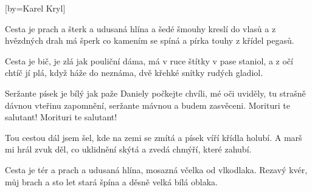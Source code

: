 [by={Karel Kryl}]

\beginverse{}
Cesta je prach a šterk a udusaná hlína
a šedé šmouhy kreslí do vlasů
\lrep{} a z hvězdných drah má šperk co kamením se spíná
a pírka touhy z křídel pegasů. \rrep{}
\endverse{}

\beginverse{}
Cesta je bič, je zlá jak pouliční dáma,
má v ruce štítky v pase staniol,
\lrep{} a z očí chtíč jí plá, když háže do neznáma,
dvě křehké snítky rudých gladiol. \rrep{}
\endverse{}

\beginchorus{}
Seržante písek je bílý jak paže Daniely
počkejte chvíli, mé oči uviděly,
tu strašně dávnou vteřinu zapomnění,
seržante mávnou a budem zasvěceni.
Morituri te salutant! Morituri te salutant!
\endchorus{}

\beginverse{}
Tou cestou dál jsem šel, kde na zemi se zmítá
a písek víří křídla holubí.
\lrep{} A marš mi hrál zvuk děl, co uklidnění skýtá
a zvedá chmýří, které zahubí. \rrep{}
\endverse{}

\beginverse{}
Cesta je tér a prach a udusaná hlína,
mosazná včelka od vlkodlaka.
\lrep{} Rezavý kvér, můj brach a sto let stará špína
a děsně velká bílá oblaka. \rrep{}
\endverse{}

\beginchorus{}

\endchorus{}

\endsong{}
